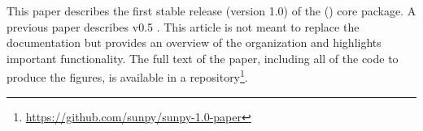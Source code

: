 This paper describes the first stable release (version 1.0) of the (\sunpypkg) core package.
A previous paper describes v0.5 \citep{Community:2015cy}.
This article is not meant to replace the \sunpypkg documentation but provides an overview of the organization and highlights important functionality.
The full text of the paper, including all of the code to produce the figures, is available in a \github repository\footnote{\url{https://github.com/sunpy/sunpy-1.0-paper}}.